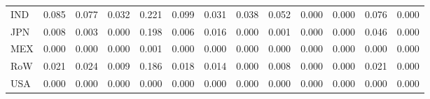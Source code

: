 \begin{table}[htbp]
\begin{tabular}{lcccccccccccc}
  IND & \textcolor[RGB]{23,15,232}{0.085} & \textcolor[RGB]{32,21,223}{0.077} & \textcolor[RGB]{66,43,189}{0.032} & \textcolor[RGB]{0,0,255}{0.221} & \textcolor[RGB]{19,12,236}{0.099} & \textcolor[RGB]{68,44,187}{0.031} & \textcolor[RGB]{59,38,196}{0.038} & \textcolor[RGB]{47,30,208}{0.052} & \textcolor[RGB]{255,165,0}{0.000} & \textcolor[RGB]{255,165,0}{0.000} & \textcolor[RGB]{34,22,221}{0.076} & \textcolor[RGB]{255,165,0}{0.000} \\ 
  JPN & \textcolor[RGB]{110,72,144}{0.008} & \textcolor[RGB]{121,78,134}{0.003} & \textcolor[RGB]{255,165,0}{0.000} & \textcolor[RGB]{2,1,253}{0.198} & \textcolor[RGB]{119,77,136}{0.006} & \textcolor[RGB]{94,61,162}{0.016} & \textcolor[RGB]{255,165,0}{0.000} & \textcolor[RGB]{132,85,123}{0.001} & \textcolor[RGB]{255,165,0}{0.000} & \textcolor[RGB]{255,165,0}{0.000} & \textcolor[RGB]{51,33,204}{0.046} & \textcolor[RGB]{255,165,0}{0.000} \\ 
  MEX & \textcolor[RGB]{255,165,0}{0.000} & \textcolor[RGB]{255,165,0}{0.000} & \textcolor[RGB]{255,165,0}{0.000} & \textcolor[RGB]{134,87,121}{0.001} & \textcolor[RGB]{255,165,0}{0.000} & \textcolor[RGB]{255,165,0}{0.000} & \textcolor[RGB]{255,165,0}{0.000} & \textcolor[RGB]{255,165,0}{0.000} & \textcolor[RGB]{255,165,0}{0.000} & \textcolor[RGB]{255,165,0}{0.000} & \textcolor[RGB]{255,165,0}{0.000} & \textcolor[RGB]{255,165,0}{0.000} \\ 
  RoW & \textcolor[RGB]{79,51,176}{0.021} & \textcolor[RGB]{74,48,181}{0.024} & \textcolor[RGB]{104,67,151}{0.009} & \textcolor[RGB]{4,3,251}{0.186} & \textcolor[RGB]{89,58,166}{0.018} & \textcolor[RGB]{100,65,155}{0.014} & \textcolor[RGB]{255,165,0}{0.000} & \textcolor[RGB]{106,69,149}{0.008} & \textcolor[RGB]{255,165,0}{0.000} & \textcolor[RGB]{255,165,0}{0.000} & \textcolor[RGB]{81,52,174}{0.021} & \textcolor[RGB]{255,165,0}{0.000} \\ 
  USA & \textcolor[RGB]{255,165,0}{0.000} & \textcolor[RGB]{255,165,0}{0.000} & \textcolor[RGB]{255,165,0}{0.000} & \textcolor[RGB]{255,165,0}{0.000} & \textcolor[RGB]{255,165,0}{0.000} & \textcolor[RGB]{255,165,0}{0.000} & \textcolor[RGB]{255,165,0}{0.000} & \textcolor[RGB]{255,165,0}{0.000} & \textcolor[RGB]{255,165,0}{0.000} & \textcolor[RGB]{255,165,0}{0.000} & \textcolor[RGB]{255,165,0}{0.000} & \textcolor[RGB]{255,165,0}{0.000} \\ 
   \hline
\end{tabular}
\end{table}
